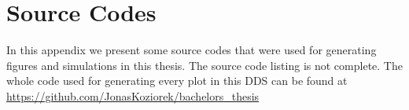 \chapter{Source Codes}
\label{sec:Appendix_codes}

In this appendix we present some source codes that were used for generating figures and simulations in this thesis.
The source code listing is not complete.
The whole code used for generating every plot in this DDS can be found at \url{https://github.com/JonasKoziorek/bachelors_thesis}






\endinput